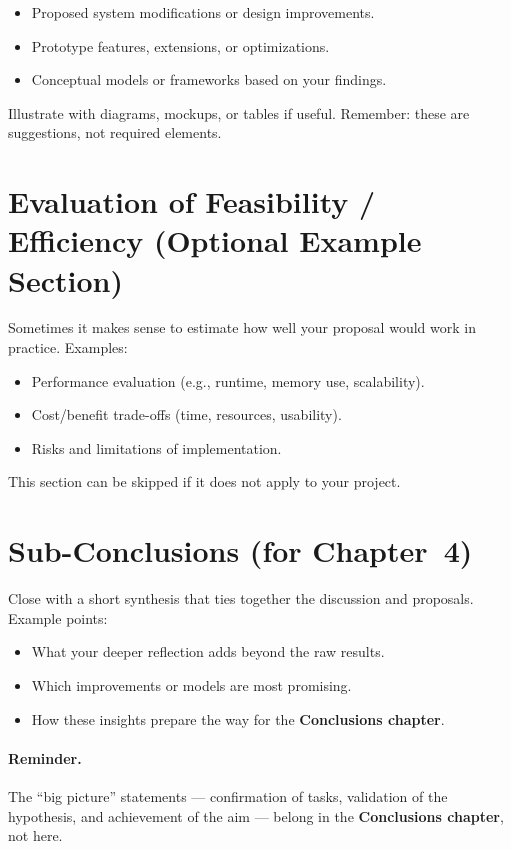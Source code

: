 \begin{itemize}[leftmargin=1.2cm]
  \item Proposed system modifications or design improvements.  
  \item Prototype features, extensions, or optimizations.  
  \item Conceptual models or frameworks based on your findings.  
\end{itemize}

Illustrate with diagrams, mockups, or tables if useful. Remember: these are suggestions, not required elements.

\section{Evaluation of Feasibility / Efficiency (Optional Example Section)}
\label{sec:evaluation}
Sometimes it makes sense to estimate how well your proposal would work in practice.  
Examples:

\begin{itemize}[leftmargin=1.2cm]
  \item Performance evaluation (e.g., runtime, memory use, scalability).  
  \item Cost/benefit trade-offs (time, resources, usability).  
  \item Risks and limitations of implementation.  
\end{itemize}

This section can be skipped if it does not apply to your project.

\section{Sub-Conclusions (for Chapter~4)}
\label{sec:subconcl4}
Close with a short synthesis that ties together the discussion and proposals.  
Example points:

\begin{itemize}[leftmargin=1.2cm]
  \item What your deeper reflection adds beyond the raw results.  
  \item Which improvements or models are most promising.  
  \item How these insights prepare the way for the \textbf{Conclusions chapter}.  
\end{itemize}

\paragraph{Reminder.} The “big picture” statements — confirmation of tasks, validation of the hypothesis, and achievement of the aim — belong in the \textbf{Conclusions chapter}, not here.

